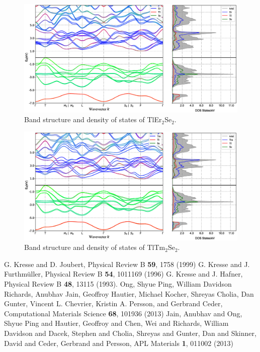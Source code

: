 \documentclass[onecolumn]{revtex4}
\begin{document}
 

\begin{figure}[ht]
	\centering
\includegraphics[scale=0.4]{img/Er_BAND+DOS}
	\caption{Band structure and density of states of TlEr$_2$Se$_2$. }
\end{figure}	
\begin{figure}[ht]
	\centering
	\includegraphics[scale=0.4]{img/Tm_BAND+DOS}
	\caption{Band structure and density of states of TlTm$_2$Se$_2$. }
\end{figure}
%
%

\begin{thebibliography}{99}
 G. Kresse and D. Joubert, Physical Review B \textbf{59}, 1758 (1999)
G. Kresse and J. Furthm\"{u}ller, Physical Review B  \textbf{54}, 1011169 (1996)
G. Kresse and J. Hafner, Physical Review B \textbf{48}, 13115 (1993).
 Ong, Shyue Ping, William Davidson Richards, Anubhav Jain, Geoffroy Hautier, Michael Kocher, Shreyas Cholia, Dan Gunter, Vincent L. Chevrier, Kristin A. Persson, and Gerbrand Ceder, Computational Materials Science \textbf{68}, 101936 (2013)
 Jain, Anubhav and Ong, Shyue Ping and Hautier, Geoffroy and Chen, Wei and Richards, William Davidson and Dacek, Stephen and Cholia, Shreyas and Gunter, Dan and Skinner, David and Ceder, Gerbrand and Persson, APL Materials \textbf{1}, 011002 (2013)
\end{thebibliography}
\end{document}
